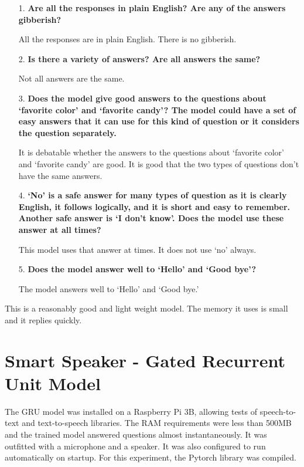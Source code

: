 \begin{itemize}
	\item [1.] \textbf{Are all the responses in plain English? Are any of the answers gibberish?}
	
	\item [] All the responses are in plain English. There is no gibberish.
	
	\item [2.] \textbf{Is there a  variety of answers? Are all answers the same?}
	
	\item [] Not all answers are the same.
	\item [3.] \textbf{Does the model give good answers to the questions about `favorite color' and `favorite candy'? The model could have a set of easy answers that it can use for this kind of question or it considers the question separately.} 
	
	\item[] It is debatable whether the answers to the questions about `favorite color' and `favorite candy' are good. It is good that the two types of questions don't have the same answers.
	
	\item [4.] \textbf{`No' is a safe answer for many types of question as it is clearly English, it follows logically, and it is short and easy to remember. Another safe answer is `I don't know'. Does the model use these answer at all times?}
	
	\item[] This model uses that answer at times. It does not use `no' always.
	
	\item [5.] \textbf{Does the model answer well to `Hello' and `Good bye'?}
	
	\item []The model answers well to `Hello' and `Good bye.'
\end{itemize}

This is a reasonably good and light weight model. The memory it uses is small and it replies quickly.

\section{Smart Speaker - Gated Recurrent Unit Model}

The GRU model was installed on a Raspberry Pi 3B, allowing tests of speech-to-text and text-to-speech libraries. The RAM requirements were less than 500MB and the trained model answered questions almost instantaneously. It was outfitted with a microphone and a speaker. It was also configured to run automatically on startup. For this experiment, the Pytorch library was compiled.


